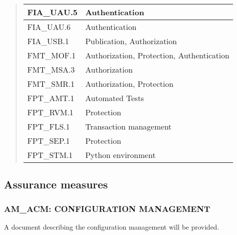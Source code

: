 \documentclass[10pt,a4paper,english]{article}
\newlength{\locallinewidth}
\begin{document}
\begin{quote}
\begin{longtable}[c]{|p{0.27\locallinewidth}|p{0.59\locallinewidth}|}
FIA{\_}UAU.5
 & 
Authentication
 \\
\hline

FIA{\_}UAU.6
 & 
Authentication
 \\
\hline

FIA{\_}USB.1
 & 
Publication, Authorization
 \\
\hline

FMT{\_}MOF.1
 & 
Authorization, Protection, Authentication
 \\
\hline

FMT{\_}MSA.3
 & 
Authorization
 \\
\hline

FMT{\_}SMR.1
 & 
Authorization, Protection
 \\
\hline

FPT{\_}AMT.1
 & 
Automated Tests
 \\
\hline

FPT{\_}RVM.1
 & 
Protection
 \\
\hline

FPT{\_}FLS.1
 & 
Transaction management
 \\
\hline

FPT{\_}SEP.1
 & 
Protection
 \\
\hline

FPT{\_}STM.1
 & 
Python environment
 \\
\hline
\end{longtable}
\end{quote}



\hypertarget{assurance-measures}{}
\subsection*{Assurance measures}



\hypertarget{am-acm-configuration-management}{}
\subsubsection*{AM{\_}ACM: CONFIGURATION MANAGEMENT}

A document describing the configuration management will be provided.


\end{document}
